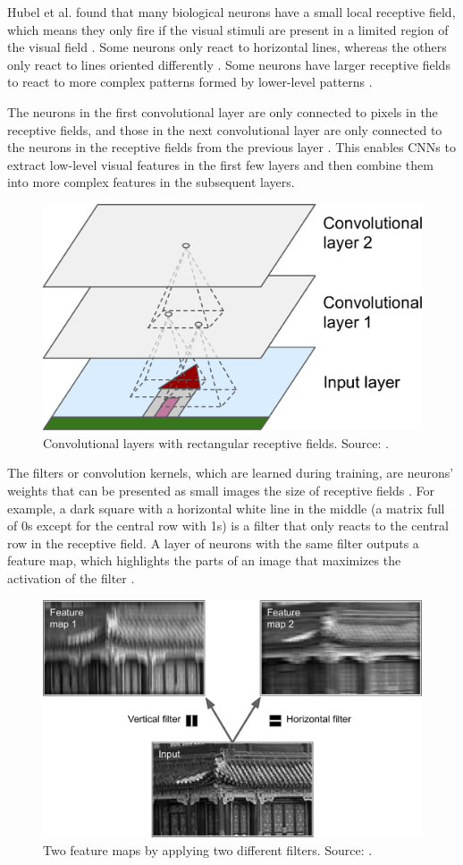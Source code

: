 \documentclass[a4paper, 11pt, oneside]{article}
\begin{document}
Hubel et al. \cite{hubel1959single, hubel1959receptive, hubel1968receptive} found that many biological neurons have
a small local receptive field, which means they only fire if the visual stimuli are present in a limited region of
the visual field \cite{geron2019hands}. Some neurons only react to horizontal lines, whereas the others only react to
lines oriented differently \cite{geron2019hands}. Some neurons have larger receptive fields to react to more complex
patterns formed by lower-level patterns \cite{geron2019hands}.

The neurons in the first convolutional layer are only connected to pixels in the receptive fields, and those in
the next convolutional layer are only connected to the neurons in the receptive fields from the previous layer
\cite{geron2019hands}. This enables CNNs to extract low-level visual features in the first few layers and then combine
them into more complex features in the subsequent layers.

\begin{figure}[ht]
  \begin{center}
    \includegraphics[width=.5\textwidth]{cnn_layers.png}
  \end{center}
  \caption{Convolutional layers with rectangular receptive fields. Source: \cite{geron2019hands}.}
\end{figure}

The filters or convolution kernels, which are learned during training, are neurons' weights that can be presented as
small images the size of receptive fields \cite{geron2019hands}. For example, a dark square with a horizontal white
line in the middle (a matrix full of 0s except for the central row with 1s) is a filter that only reacts to the central
row in the receptive field. A layer of neurons with the same filter outputs a feature map, which highlights the parts
of an image that maximizes the activation of the filter \cite{geron2019hands}.

\begin{figure}[ht]
  \begin{center}
    \includegraphics[width=.6\textwidth]{filters.png}
  \end{center}
  \caption{Two feature maps by applying two different filters. Source: \cite{geron2019hands}.}
\end{figure}
\end{document}

